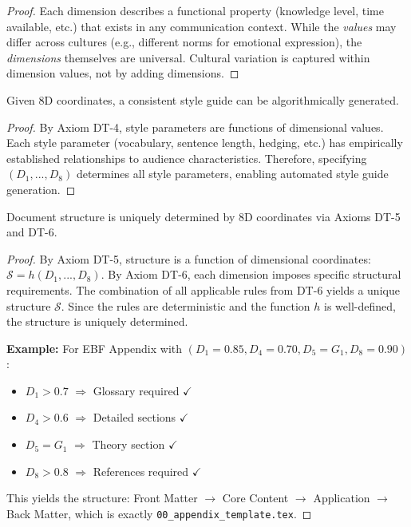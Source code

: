 \begin{proof}
Each dimension describes a functional property (knowledge level, time available,
etc.) that exists in any communication context.
While the \textit{values} may differ across cultures (e.g., different norms
for emotional expression), the \textit{dimensions} themselves are universal.
Cultural variation is captured within dimension values, not by adding dimensions.
\end{proof}

\begin{proposition}
Given 8D coordinates, a consistent style guide can be algorithmically generated.
\end{proposition}

\begin{proof}
By Axiom DT-4, style parameters are functions of dimensional values.
Each style parameter (vocabulary, sentence length, hedging, etc.) has
empirically established relationships to audience characteristics.
Therefore, specifying $(D_1, ..., D_8)$ determines all style parameters,
enabling automated style guide generation.
\end{proof}

\begin{proposition}
Document structure is uniquely determined by 8D coordinates via Axioms DT-5 and DT-6.
\end{proposition}

\begin{proof}
By Axiom DT-5, structure is a function of dimensional coordinates: $\mathcal{S} = h(D_1, ..., D_8)$.
By Axiom DT-6, each dimension imposes specific structural requirements.
The combination of all applicable rules from DT-6 yields a unique structure $\mathcal{S}$.
Since the rules are deterministic and the function $h$ is well-defined,
the structure is uniquely determined.

\textbf{Example:} For EBF Appendix with $(D_1=0.85, D_4=0.70, D_5=G_1, D_8=0.90)$:
\begin{itemize}[nosep]
\item $D_1 > 0.7$ $\Rightarrow$ Glossary required $\checkmark$
\item $D_4 > 0.6$ $\Rightarrow$ Detailed sections $\checkmark$
\item $D_5 = G_1$ $\Rightarrow$ Theory section $\checkmark$
\item $D_8 > 0.8$ $\Rightarrow$ References required $\checkmark$
\end{itemize}
This yields the structure: Front Matter $\to$ Core Content $\to$ Application $\to$ Back Matter,
which is exactly \texttt{00\_appendix\_template.tex}.
\end{proof}

